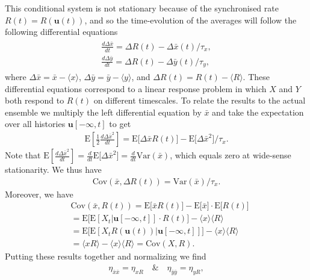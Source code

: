 \documentclass[%
 reprint,prx,
superscriptaddress,
%
%
%
%
%
%
%
%
%
 amsmath,amssymb,
 aps,
%
%
%
%
%
%
]{revtex4-2}
\begin{document}
This conditional system is not stationary because of the synchronised rate $R(t) = R(\mathbf{u}(t))$, and so the time-evolution of the averages will follow the following differential 
equations~\cite{Hilfinger2011}
\begin{align}
\begin{split}
    \frac{d\Delta \bar{x}}{dt} = \Delta R(t) - \Delta \bar{x}(t)/\tau_{x},  \\ \frac{d \Delta \bar{y}}{dt} = \Delta R(t) - \Delta \bar{y}(t)/\tau_{y},
\end{split}
\label{EQ: no-feedback 1-step differential equations}
\end{align}
where $\Delta \bar{x} = \bar{x} - \langle x \rangle$, $\Delta \bar{y} = \bar{y} - \langle y \rangle$, 
and $\Delta R(t) = R(t) - \langle R \rangle$. These differential equations correspond to a linear response problem in which $X$ and $Y$ both respond to $R(t)$ on different timescales.
To relate the results to the actual ensemble we  multiply the left differential equation 
by $\bar{x}$ and take the expectation over all histories $\mathbf{u}[-\infty,t]$ to get 
\begin{align*}
    \mathrm{E}\left[\frac{1}{2}\frac{d \Delta \bar{x}^{2}}{dt} \right] = \mathrm{E}\big[\Delta \bar{x}R(t) \big] - \mathrm{E}\big[\Delta \bar{x}^{2}\big]/\tau_{x} .
\end{align*}
Note that $\mathrm{E}\left[\frac{d \Delta \bar{x}^{2}}{dt}\right] = \frac{d}{dt} \mathrm{E} \big[ \Delta \bar{x}^{2} \big] = \frac{d}{dt}\text{Var}(\bar{x})$, which equals zero 
at wide-sense stationarity. We thus have 
\begin{align*}
    \text{Cov}( \bar{x} , \Delta R(t) ) = \text{Var}( \bar{x} ) /\tau_{x} .
\end{align*}
Moreover, we have
\begin{align*}
&\text{Cov}(\bar{x},R(t)) = \mathrm{E}\big[ \bar{x}R(t) \big] - \mathrm{E}\big[\bar{x}\big] \cdot \mathrm{E}\big[R(t)\big] \\
    &= \mathrm{E}\big[ \mathrm{E}[ X_{t}|\mathbf{u}[-\infty,t]] \cdot R(t) \big] - \langle x \rangle \langle R \rangle  \\
    &= \mathrm{E}\big[ \mathrm{E}[ X_{t} R(\mathbf{u}(t))|\mathbf{u}[-\infty,t]] \big] - \langle x \rangle \langle R \rangle   \\
    &=  \langle xR \rangle \nonumber -  \langle x \rangle \langle R \rangle = \text{Cov}(X,R)  .
\end{align*}
Putting these results together and normalizing we find 
\begin{align}
 \eta_{\bar{x}\bar{x}} = \eta_{xR} \quad \text{\&} \quad \eta_{\bar{y}\bar{y}} = \eta_{yR} ,
 \label{EQ: no-feedback 1-step barbar equals xR}
\end{align}
\end{document}
